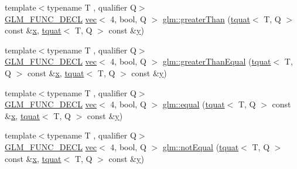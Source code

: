 \begin{DoxyCompactItemize}
\item 
{\footnotesize template$<$typename T , qualifier Q$>$ }\\\hyperlink{setup_8hpp_ab2d052de21a70539923e9bcbf6e83a51}{G\+L\+M\+\_\+\+F\+U\+N\+C\+\_\+\+D\+E\+CL} \hyperlink{structglm_1_1vec}{vec}$<$ 4, bool, Q $>$ \hyperlink{group__gtc__quaternion_ga3f2720e2d77ec39186415f85ecd9cad0}{glm\+::greater\+Than} (\hyperlink{structglm_1_1tquat}{tquat}$<$ T, Q $>$ const \&\hyperlink{_s_d_l__opengl_8h_ad0e63d0edcdbd3d79554076bf309fd47}{x}, \hyperlink{structglm_1_1tquat}{tquat}$<$ T, Q $>$ const \&\hyperlink{_s_d_l__opengl_8h_a1675d9d7bb68e1657ff028643b4037e3}{y})
\item 
{\footnotesize template$<$typename T , qualifier Q$>$ }\\\hyperlink{setup_8hpp_ab2d052de21a70539923e9bcbf6e83a51}{G\+L\+M\+\_\+\+F\+U\+N\+C\+\_\+\+D\+E\+CL} \hyperlink{structglm_1_1vec}{vec}$<$ 4, bool, Q $>$ \hyperlink{group__gtc__quaternion_ga293cb3175d9ad290deaf50984716fd44}{glm\+::greater\+Than\+Equal} (\hyperlink{structglm_1_1tquat}{tquat}$<$ T, Q $>$ const \&\hyperlink{_s_d_l__opengl_8h_ad0e63d0edcdbd3d79554076bf309fd47}{x}, \hyperlink{structglm_1_1tquat}{tquat}$<$ T, Q $>$ const \&\hyperlink{_s_d_l__opengl_8h_a1675d9d7bb68e1657ff028643b4037e3}{y})
\item 
{\footnotesize template$<$typename T , qualifier Q$>$ }\\\hyperlink{setup_8hpp_ab2d052de21a70539923e9bcbf6e83a51}{G\+L\+M\+\_\+\+F\+U\+N\+C\+\_\+\+D\+E\+CL} \hyperlink{structglm_1_1vec}{vec}$<$ 4, bool, Q $>$ \hyperlink{group__gtc__quaternion_ga22089a76bfb7b45b4c34961bb715e2df}{glm\+::equal} (\hyperlink{structglm_1_1tquat}{tquat}$<$ T, Q $>$ const \&\hyperlink{_s_d_l__opengl_8h_ad0e63d0edcdbd3d79554076bf309fd47}{x}, \hyperlink{structglm_1_1tquat}{tquat}$<$ T, Q $>$ const \&\hyperlink{_s_d_l__opengl_8h_a1675d9d7bb68e1657ff028643b4037e3}{y})
\item 
{\footnotesize template$<$typename T , qualifier Q$>$ }\\\hyperlink{setup_8hpp_ab2d052de21a70539923e9bcbf6e83a51}{G\+L\+M\+\_\+\+F\+U\+N\+C\+\_\+\+D\+E\+CL} \hyperlink{structglm_1_1vec}{vec}$<$ 4, bool, Q $>$ \hyperlink{group__gtc__quaternion_ga9494ec3489041958a240963a8a0ac9a0}{glm\+::not\+Equal} (\hyperlink{structglm_1_1tquat}{tquat}$<$ T, Q $>$ const \&\hyperlink{_s_d_l__opengl_8h_ad0e63d0edcdbd3d79554076bf309fd47}{x}, \hyperlink{structglm_1_1tquat}{tquat}$<$ T, Q $>$ const \&\hyperlink{_s_d_l__opengl_8h_a1675d9d7bb68e1657ff028643b4037e3}{y})
\item 

\end{DoxyCompactItemize}
